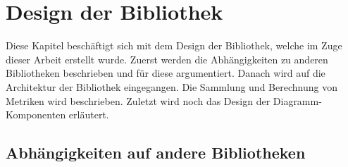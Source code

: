 \chapter{Design der Bibliothek}
\label{cha:design_der_bibliothek}

Diese Kapitel beschäftigt sich mit dem Design der Bibliothek, welche im Zuge dieser Arbeit erstellt wurde. Zuerst werden die Abhängigkeiten zu anderen Bibliotheken  \linebreak beschrieben und für diese argumentiert. Danach wird auf die Architektur der Bibliothek eingegangen. Die Sammlung und Berechnung von Metriken wird beschrieben. Zuletzt wird noch das Design der Diagramm-Komponenten erläutert.


\section{Abhängigkeiten auf andere Bibliotheken}
\label{sec:base_library}

